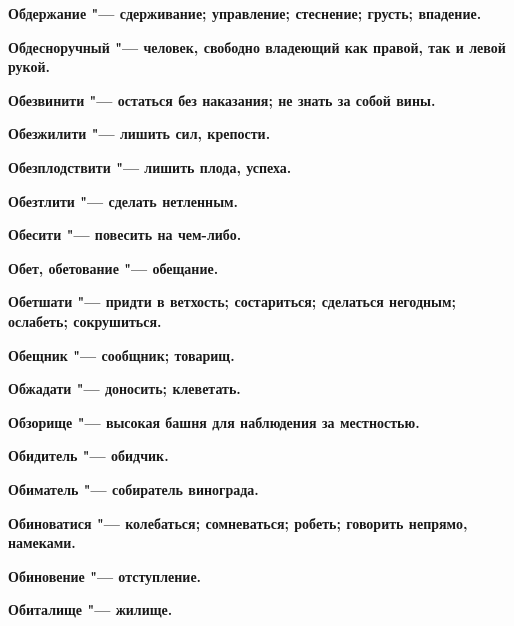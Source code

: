 \begin{mymulticols}{2}
\bfseries Обдержание\normalfont{} "--- сдерживание; управление; стеснение; грусть; впадение. 




\bfseries Обдесноручный\normalfont{} "--- человек, свободно владеющий как правой, так и левой рукой. 




\bfseries Обезвинити\normalfont{} "--- остаться без наказания; не знать за собой вины. 




\bfseries Обезжилити\normalfont{} "--- лишить сил, крепости. 




\bfseries Обезплодствити\normalfont{} "--- лишить плода, успеха. 




\bfseries Обезтлити\normalfont{} "--- сделать нетленным. 




\bfseries Обесити\normalfont{} "--- повесить на чем-либо. 




\bfseries Обет, обетование\normalfont{} "--- обещание. 




\bfseries Обетшати\normalfont{} "--- придти в ветхость; состариться; сделаться негодным; ослабеть; сокрушиться. 




\bfseries Обещник\normalfont{} "--- сообщник; товарищ. 




\bfseries Обжадати\normalfont{} "--- доносить; клеветать. 




\bfseries Обзорище\normalfont{} "--- высокая башня для наблюдения за местностью. 




\bfseries Обидитель\normalfont{} "--- обидчик. 




\bfseries Обиматель\normalfont{} "--- собиратель винограда. 




\bfseries Обиноватися\normalfont{} "--- колебаться; сомневаться; робеть; говорить непрямо, намеками. 




\bfseries Обиновение\normalfont{} "--- отступление. 




\bfseries Обиталище\normalfont{} "--- жилище. 





\end{mymulticols}
